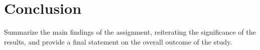 \section{Conclusion}

Summarize the main findings of the assignment, reiterating the significance of the results, and provide a final statement on the overall outcome of the study.